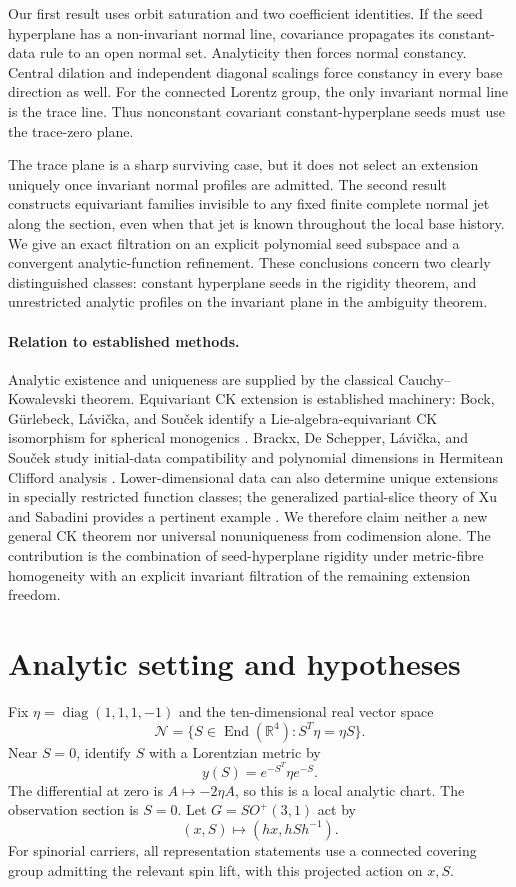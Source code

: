 \documentclass[11pt]{article}
\theoremstyle{definition}\newtheorem{definition}[theorem]{Definition}
\theoremstyle{remark}\newtheorem{remark}[theorem]{Remark}
\DeclareMathOperator{\End}{End}
\DeclareMathOperator{\diag}{diag}
\newcommand{\R}{\mathbb R}\newcommand{\C}{\mathbb C}
\newcommand{\Ncal}{\mathcal N}\newcommand{\Hobs}{\mathcal H}
\begin{document}
Our first result uses orbit saturation and two coefficient identities. If the seed hyperplane has a non-invariant normal line, covariance propagates its constant-data rule to an open normal set. Analyticity then forces normal constancy. Central dilation and independent diagonal scalings force constancy in every base direction as well. For the connected Lorentz group, the only invariant normal line is the trace line. Thus nonconstant covariant constant-hyperplane seeds must use the trace-zero plane.

The trace plane is a sharp surviving case, but it does not select an extension uniquely once invariant normal profiles are admitted. The second result constructs equivariant families invisible to any fixed finite complete normal jet along the section, even when that jet is known throughout the local base history. We give an exact filtration on an explicit polynomial seed subspace and a convergent analytic-function refinement. These conclusions concern two clearly distinguished classes: constant hyperplane seeds in the rigidity theorem, and unrestricted analytic profiles on the invariant plane in the ambiguity theorem.

\paragraph{Relation to established methods.}
Analytic existence and uniqueness are supplied by the classical Cauchy--Kowalevski theorem. Equivariant CK extension is established machinery: Bock, G\"urlebeck, L\'avi\v cka, and Sou\v cek identify a Lie-algebra-equivariant CK isomorphism for spherical monogenics \cite[Proposition~3.3]{BGLS}. Brackx, De Schepper, L\'avi\v cka, and Sou\v cek study initial-data compatibility and polynomial dimensions in Hermitean Clifford analysis \cite{BDSLS}. Lower-dimensional data can also determine unique extensions in specially restricted function classes; the generalized partial-slice theory of Xu and Sabadini provides a pertinent example \cite[Theorems~2.10--2.11]{XS}. We therefore claim neither a new general CK theorem nor universal nonuniqueness from codimension alone. The contribution is the combination of seed-hyperplane rigidity under metric-fibre homogeneity with an explicit invariant filtration of the remaining extension freedom.

\section{Analytic setting and hypotheses}\label{sec:setting}
Fix $\eta=\diag(1,1,1,-1)$ and the ten-dimensional real vector space
\[
 \Ncal=\{S\in\End(\R^4):S^T\eta=\eta S\}.
\]
Near $S=0$, identify $S$ with a Lorentzian metric by
\begin{equation}\label{eq:metric-chart}
 y(S)=e^{-S^T}\eta e^{-S}.
\end{equation}
The differential at zero is $A\mapsto-2\eta A$, so this is a local analytic chart. The observation section is $S=0$. Let $G=SO^+(3,1)$ act by
\[
 (x,S)\longmapsto (hx,hSh^{-1}).
\]
For spinorial carriers, all representation statements use a connected covering group admitting the relevant spin lift, with this projected action on $x,S$.
\end{document}
